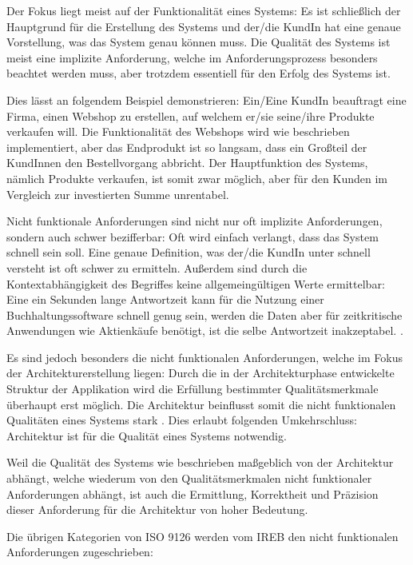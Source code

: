 Der Fokus liegt meist auf der Funktionalität eines Systems: Es ist schließlich der Hauptgrund für die Erstellung des Systems und der/die KundIn hat eine genaue Vorstellung, was das System genau können muss. Die Qualität des Systems ist meist eine implizite Anforderung, welche im Anforderungsprozess besonders beachtet werden muss, aber trotzdem essentiell für den Erfolg des Systems ist. \cite[S. 109]{softarch}

Dies lässt an folgendem Beispiel demonstrieren: Ein/Eine KundIn beauftragt eine Firma, einen Webshop zu erstellen, auf welchem er/sie seine/ihre Produkte verkaufen will. Die Funktionalität des Webshops wird wie beschrieben implementiert, aber das Endprodukt ist so langsam, dass ein Großteil der KundInnen den Bestellvorgang abbricht. Der Hauptfunktion des Systems, nämlich Produkte verkaufen, ist somit zwar möglich, aber für den Kunden im Vergleich zur investierten Summe unrentabel.

Nicht funktionale Anforderungen sind nicht nur oft implizite Anforderungen, sondern auch schwer bezifferbar: Oft wird einfach verlangt, dass das System schnell sein soll. Eine genaue Definition, was der/die KundIn unter schnell versteht ist oft schwer zu ermitteln. Außerdem sind durch die Kontextabhängigkeit des Begriffes keine allgemeingültigen Werte ermittelbar: Eine ein Sekunden lange Antwortzeit kann für die Nutzung einer Buchhaltungssoftware schnell genug sein, werden die Daten aber für zeitkritische Anwendungen wie Aktienkäufe benötigt, ist die selbe Antwortzeit inakzeptabel. \cite[S. 59]{effektiv}.

Es sind jedoch besonders die nicht funktionalen Anforderungen, welche im Fokus der Architekturerstellung liegen: Durch die in der Architekturphase entwickelte Struktur der Applikation wird die Erfüllung bestimmter Qualitätsmerkmale überhaupt erst möglich. Die Architektur beinflusst somit die nicht funktionalen Qualitäten eines Systems stark \cite[S. 109]{softarch}. Dies erlaubt folgenden Umkehrschluss: \glqq Architektur ist für die Qualität eines Systems notwendig\grqq \cite[S. 59]{effektiv}. \cite[S. 19]{effektiv}

Weil die Qualität des Systems wie beschrieben maßgeblich von der Architektur abhängt, welche wiederum von den Qualitätsmerkmalen nicht funktionaler Anforderungen abhängt, ist auch die Ermittlung, Korrektheit und Präzision dieser Anforderung für die Architektur von hoher Bedeutung.

Die übrigen Kategorien von ISO 9126 werden vom IREB den nicht funktionalen Anforderungen zugeschrieben\cite[S. 9]{ireb}:

